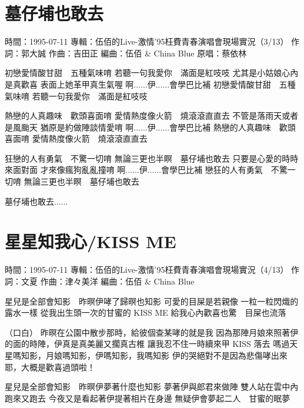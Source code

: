 \documentclass[UTF8,a4paper,oneside,twocolumn,12pt]{ctexbook}
\newcommand{\infopair}[2]{\textbullet #1：#2}
\newcommand{\zc}[1][伍佰]{\infopair{作詞}{#1}}
\newcommand{\zq}[1][伍佰]{\infopair{作曲}{#1}}
\newcommand{\bq}[1][伍佰]{\infopair{編曲}{#1}}
\newcommand{\zj}[1]{\infopair{專輯}{#1}}
\newcommand{\yc}[1]{\infopair{原唱}{#1}}
\newcommand{\sj}[1]{\infopair{時間}{#1}}
\newenvironment{info}{\begin{flushleft}\kaishu
	}
	{\end{flushleft}\normalsize\yahei\par}
\newenvironment{lyric}{
	}
{}
\begin{document}
\section{墓仔埔也敢去}
\begin{info}
	\sj{1995-07-11}
	\zj{伍佰的Live-激情'95枉費青春演唱會現場實況（3/13）}
	\zc[郭大誠]
	\zq[吉田正]
	\bq[伍佰 \& China Blue]
	\yc{蔡依林}
\end{info}
\begin{lyric}
	初戀愛情酸甘甜　五種氣味唷
	若聽一句我愛你　滿面是紅吱吱
	尤其是小姑娘心內是真歡喜
	表面上她革甲真生氣喔
	啊......伊......會學巴比補
	初戀愛情酸甘甜　五種氣味唷
	若聽一句我愛你　滿面是紅吱吱

	熱戀的人真趣味　歡頭喜面唷
	愛情熱度像火箭　燒滾滾直直去
	不管是落雨天或者是風颱天
	猶原是約做陣談情愛唷
	啊......伊......會學巴比補
	熱戀的人真趣味　歡頭喜面唷
	愛情熱度像火箭　燒滾滾直直去

	狂戀的人有勇氣　不驚一切唷
	無論三更也半瞑　墓仔埔也敢去
	只要是心愛的時時來面對面
	才來像瘋狗亂亂撞唷
	啊......伊......會學巴比補
	戀狂的人有勇氣　不驚一切唷
	無論三更也半瞑　墓仔埔也敢去

	墓仔埔也敢去......
\end{lyric}

\section{星星知我心/KISS ME}
\begin{info}
	\sj{1995-07-11}
	\zj{伍佰的Live-激情'95枉費青春演唱會現場實況（4/13）}
	\zc[文夏] %
	\zq[津々美洋]
	\bq[伍佰 \& China Blue]
\end{info}
\begin{lyric}
	星兒是全部會知影　昨暝伊哮了歸暝也知影
	可愛的目屎是若親像
	一粒一粒閃熾的露水一樣
	從我出生頭一次的甘蜜的 KISS ME
	給我心內歡喜也驚　目屎也流落

	（口白）
	昨暝在公園中散步那時，給彼個查某哮的就是我
	因為那陣月娘來照著伊的面的時陣，伊真是真美麗又擱真古椎
	讓我忍不住一時續來甲 KISS 落去
	嗎過天星嗎知影，月娘嗎知影，伊嗎知影，我嗎知影
	伊的哭絕對不是因為悲傷哮出來耶，大概是歡喜過頭啦！

	星兒是全部會知影　昨暝伊夢著什麼也知影
	夢著伊與郎君來做陣
	雙人站在雲中內跑來又跑去
	今夜又是看起著伊提著相片在身邊
	無疑伊會夢起二人　甘蜜的眠夢
\end{lyric}
\end{document}
